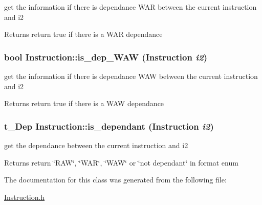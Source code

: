 get the information if there is dependance WAR between the current instruction and i2 \begin{DoxyReturn}{Returns}
return true if there is a WAR dependance 
\end{DoxyReturn}
\hypertarget{classInstruction_a6fd4dd46f540f0674486d559c1fbcd57}{
\subsubsection[{is\_\-dep\_\-WAW}]{\setlength{\rightskip}{0pt plus 5cm}bool Instruction::is\_\-dep\_\-WAW ({\bf Instruction} {\em i2})}}
\label{classInstruction_a6fd4dd46f540f0674486d559c1fbcd57}


get the information if there is dependance WAW between the current instruction and i2 \begin{DoxyReturn}{Returns}
return true if there is a WAW dependance 
\end{DoxyReturn}
\hypertarget{classInstruction_a7e93717c1e9df6fed09105accb6c728c}{
\subsubsection[{is\_\-dependant}]{\setlength{\rightskip}{0pt plus 5cm}t\_\-Dep Instruction::is\_\-dependant ({\bf Instruction} {\em i2})}}
\label{classInstruction_a7e93717c1e9df6fed09105accb6c728c}


get the dependance between the current instruction and i2 \begin{DoxyReturn}{Returns}
return \char`\"{}RAW\char`\"{}, \char`\"{}WAR\char`\"{}, \char`\"{}WAW\char`\"{} or \char`\"{}not dependant\char`\"{} in format enum 
\end{DoxyReturn}


The documentation for this class was generated from the following file:\begin{DoxyCompactItemize}
\item 
\hyperlink{Instruction_8h}{Instruction.h}\end{DoxyCompactItemize}
